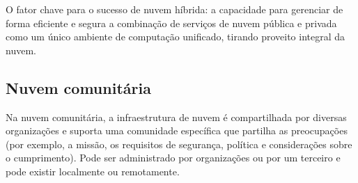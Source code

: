 O fator chave para o sucesso de nuvem híbrida: a capacidade para gerenciar de
forma eficiente e segura a combinação de serviços de nuvem pública e privada
como um único ambiente de computação unificado, tirando proveito integral da
nuvem.

\subsection{Nuvem comunitária}
Na nuvem comunitária, a infraestrutura de nuvem é compartilhada por diversas
organizações e suporta uma comunidade específica que partilha as preocupações
(por exemplo, a missão, os requisitos de segurança, política e considerações sobre
o cumprimento). Pode ser administrado por organizações ou por um terceiro e pode
existir localmente ou remotamente.
